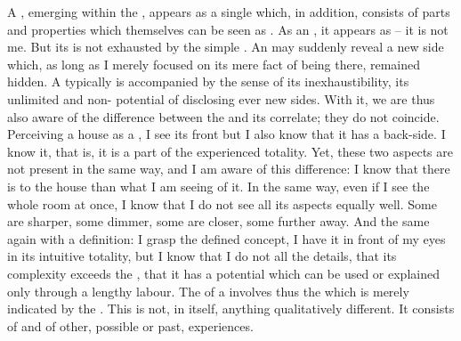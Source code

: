 \pa A , emerging within the \hoa, appears as a single 
which, in addition, 
consists of parts and properties which themselves can be seen as
. As an , it appears as
 -- it is not me.  But its  is not exhausted by
the simple 
.  An  may suddenly reveal a new side which, as long
as I merely focused on its mere fact of being there, remained hidden.  A
 typically is accompanied by the sense of its inexhaustibility, its
unlimited and non- potential of disclosing ever new sides.
With it, we are thus also aware of the difference between the 
and its correlate; they do not coincide. Perceiving a house as a , I
see its front but I also know that it has a back-side. I know it, that is, it is
a part of the experienced totality.  Yet, these two aspects are not present in
the same way, and I am aware of this difference: I know that there is 
to the house than what I am  seeing of it.
In the same way, even if I see the whole room at once, I know that I do 
not see all its aspects equally well. Some are sharper, some dimmer, some 
are closer, some further away. And the same again with a definition: I 
grasp the defined concept, I have it in front of my eyes in its intuitive 
totality, but I know that I do not  all the details, that 
its complexity exceeds the \hoa, that it has a potential which can be used 
or explained only through a lengthy labour. The  of a 
 involves thus the  which is merely indicated by the 
.
This  is not, in itself, anything 
qualitatively different. It consists of  and  of 
other, possible or past, experiences. 
%


